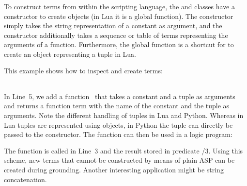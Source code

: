 To construct terms from within the scripting language,
the  and  classes have a constructor to create objects (in Lua it is a global function).
The  constructor simply takes the string representation of a constant as argument,
and the  constructor additionally takes a sequence or table of terms representing the arguments of a function.
Furthermore,
the global function  is a shortcut for  to create an object representing a tuple in Lua.

\begin{example}
This example shows how to inspect and create terms:
%
\\[-8pt] %
\begin{minipage}[t]{0.57\textwidth}

\end{minipage}
\begin{minipage}[t]{0.45\textwidth}

\end{minipage}\\
In Line~5, we add a function~
that  takes a constant and a tuple as arguments
and returns a function term with the name of the constant and the tuple as arguments.
Note the different handling of tuples in Lua and Python.
Whereas in Lua tuples are represented using  objects,
in Python the tuple can directly be passed to the  constructor.
The  function can then be used in a logic program:%
%

%
The function is called in Line~3 and the result stored in predicate /$3$.
Using this scheme,
new terms
that cannot be constructed by means of plain ASP
can be created during grounding.
Another interesting application might be string concatenation.
\end{example}

